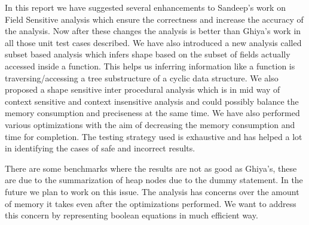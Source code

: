 
In this report we have suggested several enhancements to Sandeep's work on Field Sensitive analysis
which ensure the correctness and increase the accuracy of the analysis.
Now after these changes the analysis is better than Ghiya's work in all those unit test cases described. 
We have also introduced a new analysis called subset based analysis which infers shape based on the subset of fields actually accessed inside
a function. This helps us inferring information like a function is traversing/accessing a tree substructure of a cyclic data structure. 
We also proposed a shape sensitive inter procedural
analysis which is in mid way of context sensitive and context insensitive analysis and could possibly balance the memory consumption and 
preciseness at the same time. We have also performed various 
optimizations with the aim of decreasing the memory consumption and time for completion.
The testing strategy used is exhaustive and has helped a lot in identifying the cases of safe and incorrect results.

There are some benchmarks where the results are not as good as Ghiya's, these are due to the
summarization of heap nodes due to the dummy statement. In the future we plan to work on
this issue.
The analysis has concerns over the amount of memory it takes even after the optimizations performed. We want
to address this concern by representing boolean equations in much efficient way. 



